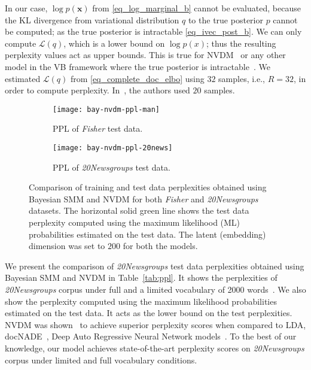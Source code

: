 \documentclass[journal]{IEEEtran}
\newcommand{\mb}[1]{\bm{#1}}
\begin{document}
In our case, \(\log p(\mb{x})\) from \eqref{eq_log_marginal_b} cannot be 
evaluated, because the KL divergence from variational distribution \(q\) to the 
true posterior \(p\) cannot be computed; as the true posterior is intractable 
\eqref{eq_ivec_post_b}. We can only compute \(\mathcal{L}(q)\), which is a 
lower bound on \(\log p(x)\); thus the resulting perplexity values act as upper 
bounds. This is true for NVDM~\cite{NVI:2016} or any other model in the VB 
framework where the true posterior is intractable~\cite{Bishop:2006:PRML}.
We estimated \(\mathcal{L}(q)\) from \eqref{eq_complete_doc_elbo} using \(32\) 
samples, i.e., \(R=32\), in order to compute perplexity. In~\cite{NVI:2016}, 
the authors used \(20\) samples.
\begin{figure*}[t!]
	\centering
	\begin{subfigure}[t]{0.45\textwidth}
		\texttt{[image: bay-nvdm-ppl-man]}
		\caption{\label{fig:ppl_man} PPL of \textit{Fisher} test data.}
	\end{subfigure}
	\begin{subfigure}[t]{0.45\textwidth}
		\texttt{[image: bay-nvdm-ppl-20news]}
		\caption{\label{fig:ppl_20news} PPL of \textit{20Newsgroups} test data.}
	\end{subfigure}
	\caption{Comparison of training and test data perplexities obtained using 
	Bayesian SMM and NVDM for both \textit{Fisher} and \textit{20Newsgroups} datasets. The 
	horizontal solid green line shows the test data perplexity computed using the maximum 
	likelihood (ML) probabilities estimated on the test data. The latent (embedding) dimension 
	was set to \(200\) for both the models.}
\end{figure*}

We present the comparison of \textit{20Newsgroups} test data perplexities 
obtained using Bayesian SMM and NVDM in Table~\ref{tab:ppl}. It shows the 
perplexities of \textit{20Newsgroups} corpus under full and a limited 
vocabulary of 2000 words~\cite{NVI:2016}. We also show the perplexity computed 
using the maximum likelihood probabilities estimated on the test data. It acts 
as the lower bound on the test perplexities. NVDM was shown~\cite{NVI:2016} to 
achieve superior perplexity scores when compared to LDA, 
docNADE~\cite{Hugo:2012:DocNADE}, Deep Auto Regressive Neural Network 
models~\cite{Mnih:2014:NVI}. To the best of our knowledge, our model achieves 
state-of-the-art perplexity scores on \textit{20Newsgroups} corpus under 
limited and full vocabulary conditions.
\end{document}
